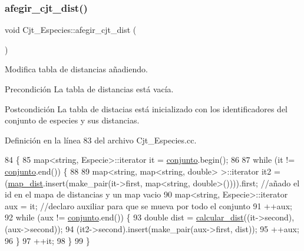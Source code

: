 \subsubsection{\texorpdfstring{afegir\+\_\+cjt\+\_\+dist()}{afegir\_cjt\_dist()}}
{\footnotesize\ttfamily void Cjt\+\_\+\+Especies\+::afegir\+\_\+cjt\+\_\+dist (\begin{DoxyParamCaption}{ }\end{DoxyParamCaption})}



Modifica tabla de distancias añadiendo. 

\begin{DoxyPrecond}{Precondición}
La tabla de distancias está vacía. 
\end{DoxyPrecond}
\begin{DoxyPostcond}{Postcondición}
La tabla de distacias está inicializado con los identificadores del conjunto de especies y sus distancias. 
\end{DoxyPostcond}


Definición en la línea 83 del archivo Cjt\+\_\+\+Especies.\+cc.


\begin{DoxyCode}
84 \{
85     map<string, Especie>::iterator it = \hyperlink{class_cjt___especies_a82ed53cbd620caca3db6b5c20b37a60a}{conjunto}.begin();
86 
87     \textcolor{keywordflow}{while} (it != \hyperlink{class_cjt___especies_a82ed53cbd620caca3db6b5c20b37a60a}{conjunto}.end()) \{
88         
89         map<string, map<string, double> >::iterator it2 = (\hyperlink{class_cjt___especies_a9b104014aea0c1472ba4e7d7fc785e9a}{map\_dist}.insert(make\_pair(it->first, 
      map<string, double>()))).first; \textcolor{comment}{//añado el id en el mapa de distancias y un map vacio}
90         map<string, Especie>::iterator aux = it; \textcolor{comment}{//declaro auxiliar para que se mueva por todo el conjunto}
91         ++aux;
92         \textcolor{keywordflow}{while} (aux != \hyperlink{class_cjt___especies_a82ed53cbd620caca3db6b5c20b37a60a}{conjunto}.end()) \{
93             \textcolor{keywordtype}{double} dist = \hyperlink{class_cjt___especies_a318c7df32ed58b513c623668772c3f84}{calcular\_dist}((it->second), (aux->second));
94             (it2->second).insert(make\_pair(aux->first, dist));
95             ++aux;
96         \}
97         ++it;
98     \}
99 \}
\end{DoxyCode}
\mbox{\label{class_cjt___especies_aa5a9db993526200a3bf0a640e4ac49bc}} 
